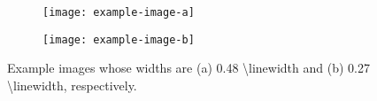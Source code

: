 \documentclass[./main]{subfiles}
\begin{document}
\begin{figure}[b]
  \centering
  \begin{subfigure}{0.6\linewidth}
    \centering
    \texttt{[image: example-image-a]}
    \captionsetup{skip=0em}
    \subcaption{}
    \label{fig:example-image-a}
  \end{subfigure}
  \begin{subfigure}{0.3\linewidth}
    \centering
    \texttt{[image: example-image-b]}
    \captionsetup{skip=0em}
    \subcaption{}
    \label{fig:example-image-b}
  \end{subfigure}
  \captionsetup{skip=-2pt}
  \caption[short caption.]{
    Example images whose widths are (a) 0.48 \textbackslash linewidth and (b) 0.27 \textbackslash linewidth, respectively. 
  }
  \label{fig:2-1}
\end{figure}


\ifSubfilesClassLoaded{%
  \printbibliography
}%
\end{document}
